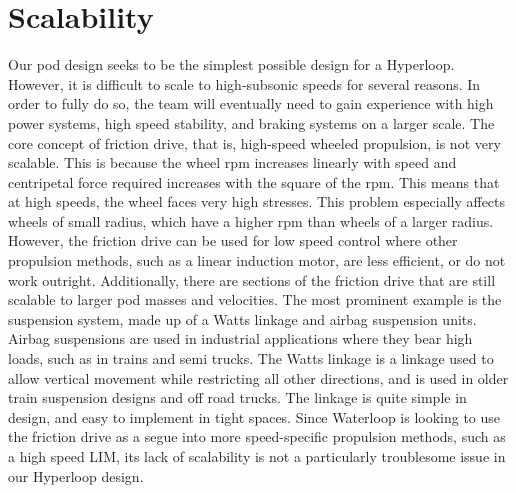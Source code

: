 \documentclass[main.tex]{subfiles}
\begin{document}
\section{Scalability}
Our pod design seeks to be the simplest possible design for a Hyperloop. However, it is difficult to scale to high-subsonic speeds for several reasons.
In order to fully do so, the team will eventually need to gain experience with high power systems, high speed stability, and braking systems on a larger scale. The core concept of friction drive, that is, high-speed wheeled propulsion, is not very scalable. This is because the wheel rpm increases linearly with speed and centripetal force required increases with the square of the rpm. This means that at high speeds, the wheel faces very high stresses. This problem especially affects wheels of small radius, which have a higher rpm than wheels of a larger radius. However, the friction drive can be used for low speed control where other propulsion methods, such as a linear induction motor, are less efficient, or do not work outright. Additionally, there are sections of the friction drive that are still scalable to larger pod masses and velocities. The most prominent example is the suspension system, made up of a Watts linkage and airbag suspension units. Airbag suspensions are used in industrial applications where they bear high loads, such as in trains and semi trucks. The Watts linkage is a linkage used to allow vertical movement while restricting all other directions, and is used in older train suspension designs and off road trucks. The linkage is quite simple in design, and easy to implement in tight spaces. Since Waterloop is looking to use the friction drive as a segue into more speed-specific propulsion methods, such as a high speed LIM, its lack of scalability is not a particularly troublesome issue in our Hyperloop design.\\
\end{document}
